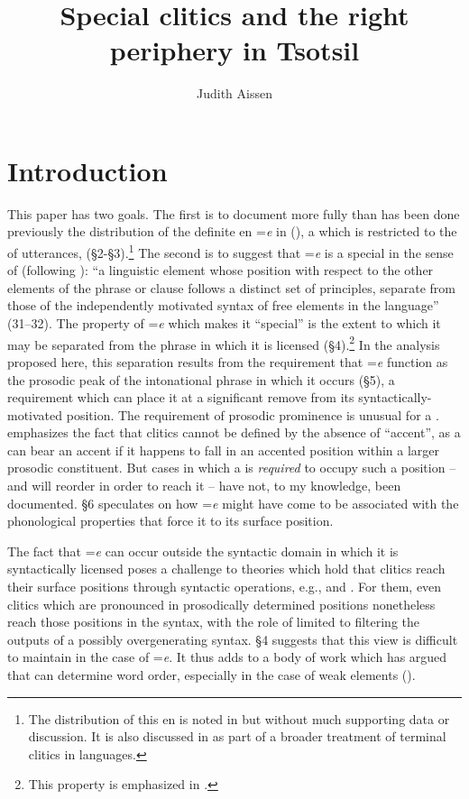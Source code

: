 \documentclass[output=paper,
modfonts
]{LSP/langsci}
\author{Judith Aissen\affiliation{University of California, Santa Cruz} }
\title{Special clitics and the right  periphery in Tsotsil}
\begin{document}
\maketitle

\section{Introduction}
This paper has two goals. The first is to document more fully than has been done previously the distribution of the definite en =\emph{e} in  (), a  which is restricted to the  of utterances, (\S2-\S3).\footnote
{The distribution of this en is noted in \citet[61]{aissen1992} but without much supporting data or discussion. 
It is also discussed in \cite{skopeteas2010} as part of a broader treatment of terminal clitics in  languages.}
The second  is to suggest that =\emph{e} is a special  in the sense of \citet{anderson2005} (following \citealt{zwicky1977}): 
``a linguistic element whose position with respect to the other elements of the phrase or clause follows a distinct set of principles, separate from those of the independently motivated syntax of free elements in the language'' (31--32). 
The property of =\emph{e} which makes it ``special'' is the extent to which it may be separated from the phrase in which it is licensed (\S4).\footnote
{This property is emphasized in \citet{skopeteas2010}.}
In the analysis proposed here, this separation results from the requirement that =\emph{e} function as the prosodic peak of the intonational phrase in which it occurs (\S5),
 a requirement which can place it at a significant remove from its syntactically-motivated position.  The requirement of prosodic prominence
 is unusual for a . \citet{anderson2005} emphasizes the fact that clitics cannot be defined by the absence of ``accent'', as a 
 can bear an accent if it happens to fall in an accented position within a larger prosodic constituent. 
 But cases in which a  is \emph{required} to occupy such a position  --  and will reorder
 in order to reach it  --  have not, to my knowledge, been documented. \S6 speculates on how =\emph{e} might have come to 
 be associated with the phonological properties that force it to its surface position. 
 
The fact that =\emph{e} can occur outside the syntactic domain in which it is syntactically licensed 
poses a challenge to theories  which hold that clitics reach their surface positions through syntactic operations, e.g., \citet{boskovic2000} and \citet{otero2011}. 
For them, even clitics which are pronounced in prosodically determined positions nonetheless reach those positions in the syntax, with the role of 
 limited to filtering the outputs of a possibly overgenerating syntax. \S4 suggests that this view is difficult to maintain in the case of =\emph{e}.
 It thus adds to a body of work which has argued that  can determine word order, especially in the case of weak elements 
 (\citealt{halpern1995, chung2003, agbayani2010, agbayani2015, bennettetal}).
   
\end{document}
